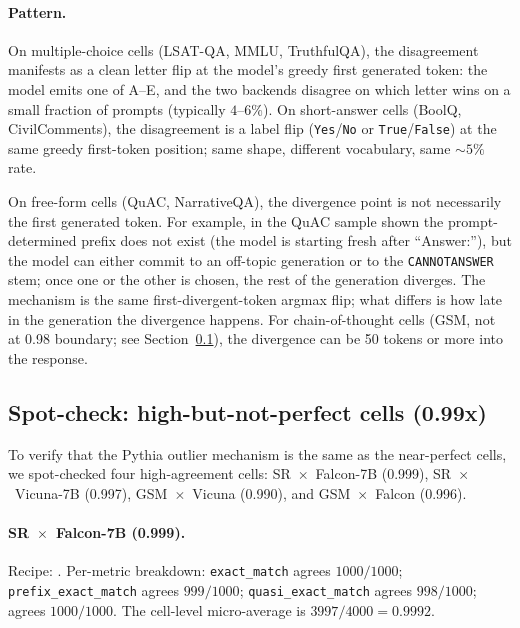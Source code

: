 \documentclass[11pt]{article}
\begin{document}
\paragraph{Pattern.}
On multiple-choice cells (LSAT-QA, MMLU, TruthfulQA), the
  disagreement manifests as a clean letter flip at the model's
  greedy first generated token: the model emits one of A--E, and the
  two backends disagree on which letter wins on a small fraction of
  prompts (typically $4$--$6\%$).
On short-answer cells (BoolQ, CivilComments), the disagreement is a
  label flip (\texttt{Yes}/\texttt{No} or
  \texttt{True}/\texttt{False}) at the same greedy first-token
  position; same shape, different vocabulary, same $\sim 5\%$ rate.

On free-form cells (QuAC, NarrativeQA), the divergence point is not
  necessarily the first generated token.
For example, in the QuAC sample shown the prompt-determined
  prefix does not exist (the model is starting fresh after
  ``Answer:''), but the model can either commit to an
  off-topic generation or to the \texttt{CANNOTANSWER} stem; once
  one or the other is chosen, the rest of the generation diverges.
The mechanism is the same first-divergent-token argmax flip; what
  differs is how late in the generation the divergence happens.
For chain-of-thought cells (GSM, not at 0.98 boundary; see
  Section~\ref{sec:tr-spot-check-near-perfect}), the divergence can
  be 50 tokens or more into the response.

\subsection{Spot-check: high-but-not-perfect cells (0.99x)}
\label{sec:tr-spot-check-near-perfect}

To verify that the Pythia outlier mechanism is the same as the
  near-perfect cells, we spot-checked four high-agreement cells:
  SR~$\times$~Falcon-7B (0.999), SR~$\times$~Vicuna-7B (0.997),
  GSM~$\times$~Vicuna (0.990), and GSM~$\times$~Falcon (0.996).

\paragraph{SR~$\times$~Falcon-7B (0.999).}
Recipe: .
Per-metric breakdown:
  \texttt{exact\_match} agrees $1000/1000$;
  \texttt{prefix\_exact\_match} agrees $999/1000$;
  \texttt{quasi\_exact\_match} agrees $998/1000$;
   agrees $1000/1000$.
The cell-level micro-average is $3997/4000 = 0.9992$.
\end{document}
